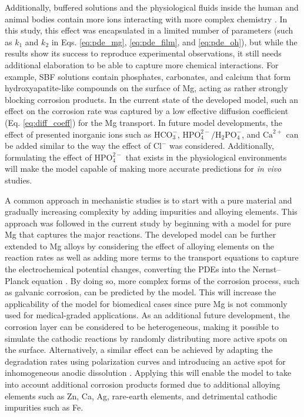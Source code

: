 Additionally, buffered solutions and the physiological fluids inside the human and animal bodies contain more ions interacting with more complex chemistry \cite{Mei2020}. In this study, this effect was encapsulated in a limited number of parameters (such as $k_1$ and $k_2$ in Eqs. \ref{eq:pde_mg}, \ref{eq:pde_film}, and \ref{eq:pde_oh}), but while the results show its success to reproduce experimental observations, it still needs additional elaboration to be able to capture more chemical interactions. For example, \gls{SBF} solutions contain phosphates, carbonates, and calcium that form hydroxyapatite-like compounds on the surface of Mg, acting as rather strongly blocking corrosion products. In the current state of the developed model, such an effect on the corrosion rate was captured by a low effective diffusion coefficient (Eq. \ref{eq:diff_coeff}) for the Mg transport. In future model developments, the effect of presented inorganic ions such as $\mathrm{HCO}^{-}_3$, $\mathrm{HPO}^{2-}_4/\mathrm{H}_2\mathrm{PO}^{-}_4$, and $\mathrm{Ca}^{2+}$ can be added similar to the way the effect of $\mathrm{Cl}^{-}$ was considered. Additionally, formulating the effect of $\mathrm{HPO}^{2-}_4$ that exists in the physiological environments will make the model capable of making more accurate predictions for \textit{in vivo} studies.

A common approach in mechanistic studies is to start with a pure material and gradually increasing complexity by adding impurities and alloying elements. This approach was followed in the current study by beginning with a model for pure Mg that captures the major reactions. The developed model can be further extended to Mg alloys by considering the effect of alloying elements on the reaction rates as well as adding more terms to the transport equations to capture the electrochemical potential changes, converting the \gls{PDE}s into the Nernst–Planck equation \cite{Deshpande2011}. By doing so, more complex forms of the corrosion process, such as galvanic corrosion, can be predicted by the model. This will increase the applicability of the model for biomedical cases since pure Mg is not commonly used for medical-graded applications. As an additional future development, the corrosion layer can be considered to be heterogeneous, making it possible to simulate the cathodic reactions by randomly distributing more active spots on the surface. Alternatively, a similar effect can be achieved by adapting the degradation rates using polarization curves and introducing an active spot for inhomogeneous anodic dissolution \cite{Dolgikh2019}. Applying this will enable the model to take into account additional corrosion products formed due to additional alloying elements such as Zn, Ca, Ag, rare-earth elements, and detrimental cathodic impurities such as Fe.

